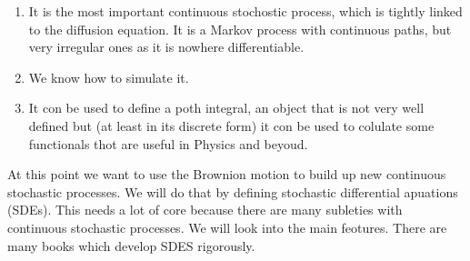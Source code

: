 \documentclass[10pt]{article}
\begin{document}
\begin{enumerate}
  \item It is the most important continuous stochostic process, which is tightly linked to the diffusion equation. It is a Markov process with continuous paths, but very irregular ones as it is nowhere differentiable.
  \item We know how to simulate it.
  \item It con be used to define a poth integral, an object that is not very well defined but (at least in its discrete form) it con be used to colulate some functionals thot are useful in Physics and beyoud.
\end{enumerate}

At this point we want to use the Brownion motion to build up new continuous stochastic processes. We will do that by defining stochastic differential apuations (SDEs). This needs a lot of core because there are many subleties with continuous stochastic processes. We will look into the main feotures. There are many books which develop SDES rigorously.
\end{document}
